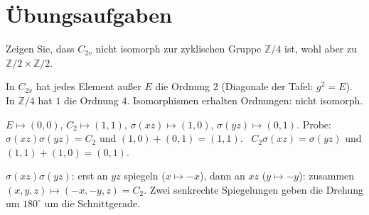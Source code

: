 \section{Übungsaufgaben}

\begin{aufgabe}
Zeigen Sie, dass $C_{2v}$ nicht isomorph zur zyklischen Gruppe $\mathbb Z/4$ ist, wohl aber zu $\mathbb Z/2\times\mathbb Z/2$.

\loesung
{}
In $C_{2v}$ hat jedes Element außer $E$ die Ordnung $2$ (Diagonale der Tafel: $g^{2} = E$). In $\mathbb Z/4$ hat $1$ die Ordnung $4$. Isomorphismen erhalten Ordnungen: nicht isomorph.

$E\mapsto(0, 0)$, $C_2\mapsto(1, 1)$, $\sigma(xz)\mapsto(1, 0)$, $\sigma(yz)\mapsto(0, 1)$. Probe: $\sigma(xz)\sigma(yz) = C_2$ und $(1, 0) + (0, 1) = (1, 1)$. \checkmark\ $C_2\sigma(xz) = \sigma(yz)$ und $(1, 1) + (1, 0) = (0, 1)$. \checkmark

$\sigma(xz)\sigma(yz)$: erst an $yz$ spiegeln ($x\mapsto-x$), dann an $xz$ ($y\mapsto-y$): zusammen $(x, y, z)\mapsto(-x, -y, z) = C_2$. Zwei senkrechte Spiegelungen geben die Drehung um $180^{\circ}$ um die Schnittgerade. \checkmark

\begin{center}
\begin{minipage}{0.88\textwidth}
\end{minipage}
\end{center}
\end{aufgabe}

